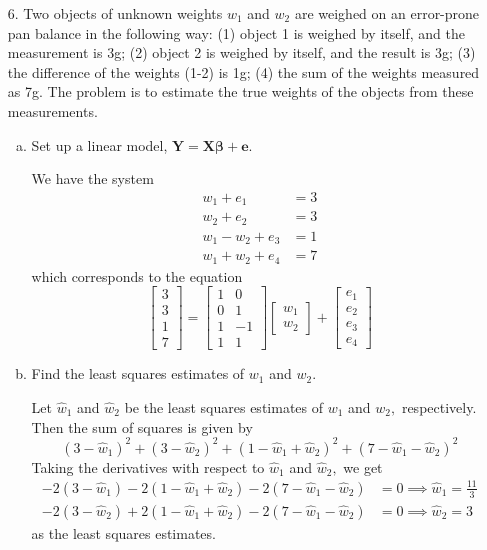 \documentclass{article}
\begin{document}
\begin{itemize}
	\item[6.] Two objects of unknown weights $w_1$ and $w_2$ are weighed on an error-prone pan balance in the following way: (1) object 1 is weighed by itself, and the measurement is 3g; (2) object 2 is weighed by itself, and the result is 3g; (3) the difference of the weights (1-2) is 1g; (4) the sum of the weights measured as 7g. The problem is to estimate the true weights of the objects from these measurements.
		\begin{enumerate}[a.]
			\item Set up a linear model, $\mathbf{Y}=\mathbf{X}\mathbf{\beta}+\mathbf{e}.$
				\begin{soln}
					We have the system
					\begin{align*}
						w_1 + e_1 &= 3 \\
						w_2 + e_2 &= 3 \\
						w_1-w_2+e_3 &= 1 \\
						w_1+w_2+e_4 &= 7
					\end{align*}
					which corresponds to the equation 
					\[\begin{bmatrix}
							3 \\ 3 \\ 1 \\ 7
						\end{bmatrix} = \begin{bmatrix}
							1 & 0 \\ 0 & 1 \\ 1 & -1 \\ 1 & 1
						\end{bmatrix}\begin{bmatrix}
							w_1 \\ w_2
						\end{bmatrix} + \begin{bmatrix}
							e_1 \\ e_2 \\ e_3 \\ e_4
					\end{bmatrix}\]
				\end{soln}

			\item Find the least squares estimates of $w_1$ and $w_2.$
				\begin{soln}
					Let $\hat w_1$ and $\hat w_2$ be the least squares estimates of $w_1$ and $w_2,$ respectively. Then the sum of squares is given by
					\[(3-\hat w_1)^2 + (3-\hat w_2)^2 + (1-\hat w_1+\hat w_2)^2 + (7-\hat w_1-\hat w_2)^2\]
					Taking the derivatives with respect to $\hat w_1$ and $\hat w_2,$ we get
					\begin{align*}
						-2(3-\hat w_1) - 2(1-\hat w_1 + \hat w_2) - 2(7-\hat w_1-\hat w_2) &= 0 \implies \hat w_1 = \frac{11}{3} \\
						-2(3-\hat w_2) + 2(1-\hat w_1 + \hat w_2) - 2(7-\hat w_1-\hat w_2) &= 0 \implies \hat w_2 = 3
					\end{align*}
					as the least squares estimates.
				\end{soln}


\end{enumerate}
\end{itemize}
\end{document}
